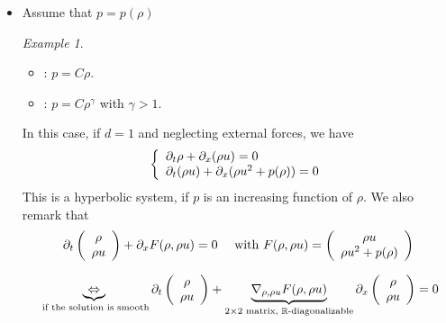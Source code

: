 \documentclass{report}
\newcommand{\R}{\ensuremath{\mathbb{R}}} %
\newcommand*{\definition}[1]{\noindent\textbf{\color{cadmiumgreen}{#1}}}
\theoremstyle{plain}
\theoremstyle{definition}
\theoremstyle{remark}
\newtheorem*{ex}{Example}
\begin{document}
\begin{itemize}
	\item Assume that $p=p(\rho)$
		\definition{Barotropic gaz}
\begin{ex}
	\begin{itemize}
		\item \definition{Isothermal gaz}:
			$p=C\rho$.
		\item \definition{Adiabatic gaz}:
			$p=C\rho^\gamma$ with $\gamma >1$.
	\end{itemize}
\end{ex}
	In this case, if $d=1$ and neglecting external
	forces, we have
	\begin{equation}
		\left\lbrace
		\begin{array}[]{l}
			\partial_t\rho+\partial_x(\rho u )=0\\
			\partial_t(\rho u ) + \partial_x
			(\rho u^2 + p(\rho)) = 0
		\end{array}\right.
	\end{equation}
	This is a hyperbolic system, if $p$ is an increasing
	function of $\rho$.
	We also remark that
\begin{equation}
	\partial_t \left(
	\begin{array}[]{c}
		\rho \\
		\rho u
	\end{array} \right)
	+ \partial_x F(\rho, \rho u ) = 0
	\quad \text{ with }
 	F(\rho, \rho u ) = 
	\left(
	\begin{array}[]{c}
		\rho u \\
		\rho u^2 + p(\rho)
	\end{array} \right)
\end{equation}

\begin{equation}
	\underbrace{\Leftrightarrow}_{\text{
	if the solution is smooth}} 
	\partial_t \left(
	\begin{array}[]{c}
		\rho \\
		\rho u
	\end{array} \right)
	+ \underbrace{\nabla_{\rho, \rho u} F(\rho, \rho u )
}_{2\times 2 \text{ matrix, }\R \text{-diagonalizable}}
	\partial_x \left(
	\begin{array}[]{c}
		\rho \\
		\rho u
	\end{array} \right)
	= 0
\end{equation}


\end{itemize}
\end{document}
